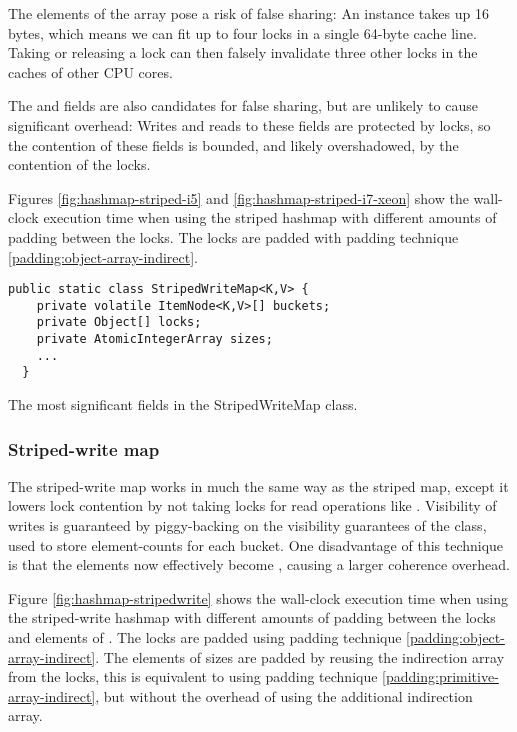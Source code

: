 The elements of the  array pose a risk of false sharing: An
 instance takes up 16 bytes\footnotemark, which means we can fit
up to four locks in a single 64-byte cache line. Taking or releasing a lock can
then falsely invalidate three other locks in the caches of other CPU cores.

The  and  fields are also candidates for false
sharing, but are unlikely to cause significant overhead: Writes and reads to
these fields are protected by locks, so the contention of these fields is
bounded, and likely overshadowed, by the contention of the locks.


Figures \ref{fig:hashmap-striped-i5} and \ref{fig:hashmap-striped-i7-xeon} show
the wall-clock execution time when using the striped hashmap with different
amounts of padding between the locks. The locks are padded with padding
technique \ref{padding:object-array-indirect}.

\begin{code}
\begin{Verbatim}[frame=single]
  public static class StripedWriteMap<K,V> {
    private volatile ItemNode<K,V>[] buckets;
    private Object[] locks;
    private AtomicIntegerArray sizes;
    ...
  }
\end{Verbatim}
	\caption{The most significant fields in the StripedWriteMap class.}
\end{code}

\subsubsection{Striped-write map}
The striped-write map works in much the same way as the striped map, except it
lowers lock contention by not taking locks for read operations like .
Visibility of writes is guaranteed by piggy-backing on the visibility
guarantees of the  class, used to store element-counts
for each bucket. One disadvantage of this technique is that the 
elements now effectively become , causing a larger coherence
overhead.

Figure \ref{fig:hashmap-stripedwrite} shows the wall-clock execution time when
using the striped-write hashmap with different amounts of padding between the
locks and elements of . The locks are padded using padding technique
\ref{padding:object-array-indirect}. The elements of sizes are padded by reusing the
indirection array from the locks, this is equivalent to using padding technique
\ref{padding:primitive-array-indirect}, but without the overhead of using the
additional indirection array.


